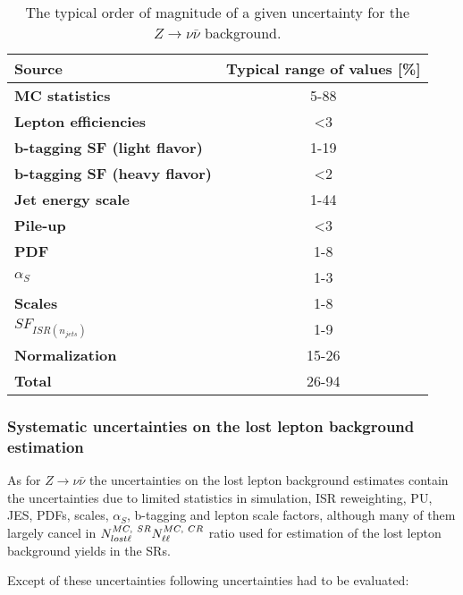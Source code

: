 \begin{table}[h]
\begin{center}
\begin{tabular}{|l|c|}
\hline
\textbf{Source}       & \textbf{Typical range of values} [\%]                       \\
\hline
\textbf{MC statistics}      &  5-88   \\
\hline
\textbf{Lepton efficiencies}              &  <3  \\
\textbf{b-tagging SF (light flavor)}      &  1-19  \\
\textbf{b-tagging SF (heavy flavor)}      &  <2  \\
\textbf{Jet energy scale}                 &  1-44  \\
\textbf{Pile-up}                          &  <3  \\
\hline
\textbf{PDF}                 &  1-8  \\
\textbf{$\alpha_{S}$}                 &  1-3  \\
\textbf{Scales}                 &  1-8  \\
\textbf{$SF_{ISR(n_{jets})}$}                 &  1-9  \\
\textbf{Normalization}                 &  15-26  \\
\hline
\textbf{Total}                 &  26-94  \\
\hline
\end{tabular}
\caption[Table caption text]{The typical order of magnitude of a given uncertainty for the $Z \to \nu \bar{\nu}$ background.  }
\label{tab:SysZnunuSum}
\end{center}
\end{table}

\subsubsection{Systematic uncertainties on the lost lepton background estimation}

As for $Z \to \nu \bar{\nu}$ the uncertainties on the lost lepton background estimates contain the uncertainties due to limited statistics in simulation, ISR reweighting, PU, JES, PDFs, scales, $\alpha_{S}$, b-tagging and lepton scale factors, although many of them largely cancel in $N^{MC,~SR}_{lost \ell}\/ N^{MC,~CR}_{\ell\ell}$ ratio used for estimation of the lost lepton background yields in the SRs.

Except of these uncertainties following uncertainties had to be evaluated:

